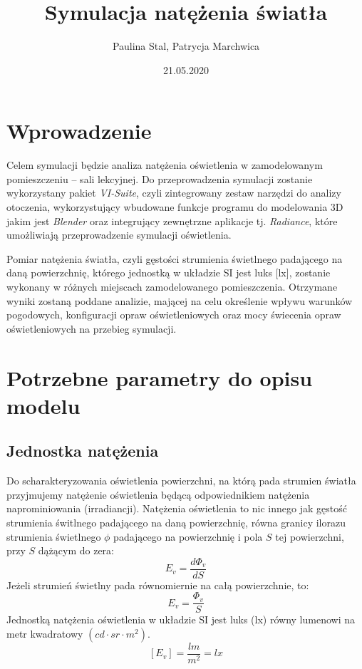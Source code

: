 \documentclass[a4paper,12pt]{article}
\title{Symulacja natężenia światła}
\author{Paulina Stal, Patrycja Marchwica}
\date{21.05.2020}
\begin{document}
	\maketitle
	
	\section{Wprowadzenie}
	\label{sec:wprowadzenie}
	
	Celem symulacji będzie analiza natężenia oświetlenia w zamodelowanym pomieszczeniu -- sali lekcyjnej. Do przeprowadzenia symulacji zostanie wykorzystany pakiet \emph{VI-Suite}, czyli zintegrowany zestaw narzędzi do analizy otoczenia, wykorzystujący wbudowane funkcje programu do modelowania 3D jakim jest \emph{Blender} oraz integrujący zewnętrzne aplikacje tj. \emph{Radiance}, które umożliwiają przeprowadzenie symulacji oświetlenia.
	
	Pomiar natężenia światła, czyli gęstości strumienia świetlnego padającego na daną powierzchnię, którego jednostką w układzie SI jest luks [lx], zostanie wykonany w różnych miejscach zamodelowanego pomieszczenia. Otrzymane wyniki zostaną poddane analizie, mającej na celu określenie wpływu warunków pogodowych, konfiguracji opraw oświetleniowych oraz mocy świecenia opraw oświetleniowych na przebieg symulacji.  
	

	\section{Potrzebne parametry do opisu modelu}
	 \label{sec:opis_modelu}

	\subsection{Jednostka natężenia}
	\label{sec:jednostka_natezenia}

	Do scharakteryzowania oświetlenia powierzchni, na którą pada strumien światła przyjmujemy natężenie oświetlenia będącą odpowiednikiem natężenia naprominiowania (irradiancji). Natężenia oświetlenia to nic innego jak gęstość strumienia świtlnego padającego na daną powierzchnię, równa granicy ilorazu strumienia świetlnego $\phi$ padającego na powierzchnię i pola $S$ tej powierzchni, przy $S$ dążącym do zera:
	$$E_{v}=\frac{d \Phi_{v}}{d S}$$
	Jeżeli strumień świetlny pada równomiernie na całą powierzchnie, to:
	$$E_{v}=\frac{\Phi_{v}}{S}$$
Jednostką natężenia oświetlenia w układzie SI jest luks (lx) równy lumenowi na metr kwadratowy $(cd \cdot sr \cdot m^{2})$.
	$$\left[E_{v}\right]=\frac{l m}{m^{2}}=l x$$
	\newpage
\end{document}
